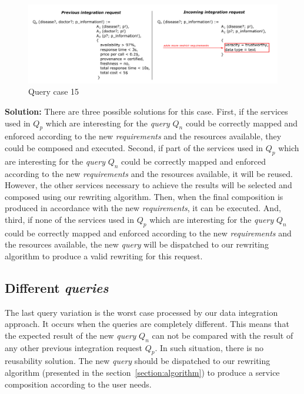 \begin{figure}[h!]
\center
\includegraphics[scale=0.85]{figures/query-case-15.pdf}\caption{Query case 15} \label{fig:case15}
\end{figure}

\bigskip
\noindent \textbf{Solution:} There are three possible solutions for this case. First, if the services used in $Q_{p}$ which are interesting for the \textsl{query} $Q_{n}$ could be correctly mapped and enforced according to the new \textsl{requirements} and the resources available, they could be composed and executed. Second, if part of the services  used in $Q_{p}$ which are interesting for the \textsl{query} $Q_{n}$ could be correctly mapped and enforced according to the new \textsl{requirements} and the resources available, it will be reused. However, the other services necessary to achieve the results will be selected and composed using our rewriting algorithm. Then, when the final composition is produced in accordance with the new \textsl{requirements}, it can be executed. And, third, if none of the services used in $Q_{p}$ which are interesting for the \textsl{query} $Q_{n}$ could be correctly mapped and enforced according to the new \textsl{requirements} and the resources available, the new \textsl{query} will be dispatched to our rewriting algorithm to produce a valid rewriting for this request.

\subsection{Different \textsl{queries}}
The last query variation is the worst case processed by our data integration approach. It occurs when the queries are completely different. This means that the expected result of the new \textsl{query} $Q_{n}$ can not be compared with the result of any other previous integration request $Q_{p}$. In such situation, there is no reusability solution. The new \textsl{query} should be dispatched to our rewriting algorithm (presented in the section~\ref{section:algorithm}) to produce a service composition according to the user needs.